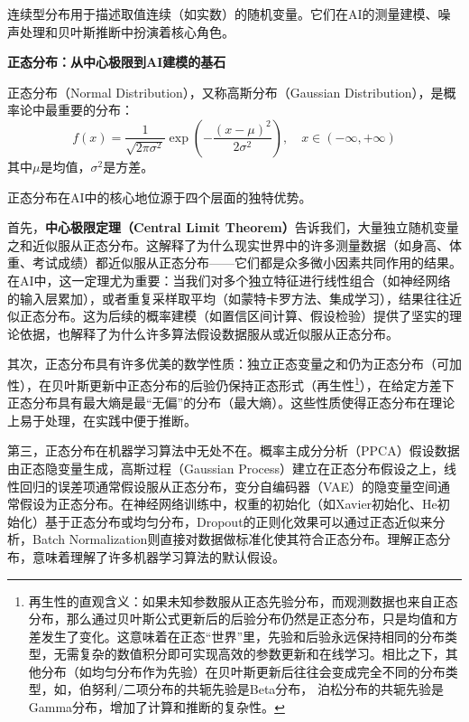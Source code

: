 连续型分布用于描述取值连续（如实数）的随机变量。它们在AI的测量建模、噪声处理和贝叶斯推断中扮演着核心角色。

\textbf{正态分布：从中心极限到AI建模的基石}

正态分布（Normal Distribution），又称高斯分布（Gaussian Distribution），是概率论中最重要的分布：
\begin{equation}
f(x) = \frac{1}{\sqrt{2\pi\sigma^2}}\exp\left(-\frac{(x-\mu)^2}{2\sigma^2}\right), \quad x\in (-\infty, +\infty)
\end{equation}
其中$\mu$是均值，$\sigma^2$是方差。

正态分布在AI中的核心地位源于四个层面的独特优势。

首先，\textbf{中心极限定理（Central Limit Theorem）}告诉我们，大量独立随机变量之和近似服从正态分布。这解释了为什么现实世界中的许多测量数据（如身高、体重、考试成绩）都近似服从正态分布——它们都是众多微小因素共同作用的结果。在AI中，这一定理尤为重要：当我们对多个独立特征进行线性组合（如神经网络的输入层累加），或者重复采样取平均（如蒙特卡罗方法、集成学习），结果往往近似正态分布。这为后续的概率建模（如置信区间计算、假设检验）提供了坚实的理论依据，也解释了为什么许多算法假设数据服从或近似服从正态分布。

其次，正态分布具有许多优美的数学性质：独立正态变量之和仍为正态分布（可加性），在贝叶斯更新中正态分布的后验仍保持正态形式（再生性\footnote{再生性的直观含义：如果未知参数服从正态先验分布，而观测数据也来自正态分布，那么通过贝叶斯公式更新后的后验分布仍然是正态分布，只是均值和方差发生了变化。这意味着在正态``世界''里，先验和后验永远保持相同的分布类型，无需复杂的数值积分即可实现高效的参数更新和在线学习。相比之下，其他分布（如均匀分布作为先验）在贝叶斯更新后往往会变成完全不同的分布类型，如，伯努利/二项分布的共轭先验是Beta分布， 泊松分布的共轭先验是Gamma分布，增加了计算和推断的复杂性。}），在给定方差下正态分布具有最大熵是最``无偏''的分布（最大熵）。这些性质使得正态分布在理论上易于处理，在实践中便于推断。

第三，正态分布在机器学习算法中无处不在。概率主成分分析（PPCA）假设数据由正态隐变量生成，高斯过程（Gaussian Process）建立在正态分布假设之上，线性回归的误差项通常假设服从正态分布，变分自编码器（VAE）的隐变量空间通常假设为正态分布。在神经网络训练中，权重的初始化（如Xavier初始化、He初始化）基于正态分布或均匀分布，Dropout的正则化效果可以通过正态近似来分析，Batch Normalization则直接对数据做标准化使其符合正态分布。理解正态分布，意味着理解了许多机器学习算法的默认假设。

